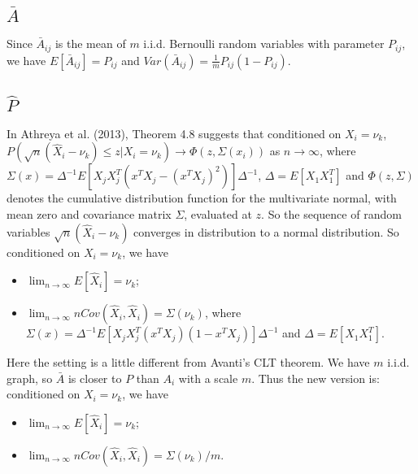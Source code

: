 \documentclass[a4paper]{article}
\begin{document}
\subsection{$\bar{A}$}

Since $\bar{A}_{ij}$ is the mean of $m$ i.i.d. Bernoulli random variables with parameter $P_{ij}$, we have $E[\bar{A}_{ij}] = P_{ij}$ and $Var(\bar{A}_{ij}) = \frac{1}{m} P_{ij} (1-P_{ij})$.



\subsection{$\hat{P}$}

In Athreya et al. (2013), Theorem 4.8 suggests that conditioned on $X_i = \nu_k$, 
$P \left( \sqrt{n} (\hat{X}_i - \nu_k) \le z | X_i = \nu_k \right) \rightarrow \Phi(z, \Sigma(x_i))$ as $n \rightarrow \infty$, where $\Sigma(x) = \Delta^{-1} E[X_j X_j^T (x^T X_j - (x^T X_j)^2)] \Delta^{-1}$, $\Delta = E[X_1 X_1^T]$ and $\Phi(z, \Sigma)$ denotes the cumulative distribution function for the multivariate normal, with mean zero and covariance matrix $\Sigma$, evaluated at $z$. So the sequence of random variables $\sqrt{n} (\hat{X}_i - \nu_k)$ converges in distribution to a normal distribution.
So conditioned on $X_i = \nu_k$, we have
\begin{itemize}
\item $\lim_{n \rightarrow \infty} E[\hat{X}_i] = \nu_k$;
\item $\lim_{n \rightarrow \infty} n Cov(\hat{X}_i, \hat{X}_i) = \Sigma(\nu_k)$, where $\Sigma(x) = \Delta^{-1} E[X_j X_j^T (x^T X_j)(1 - x^T X_j)] \Delta^{-1}$ and $\Delta = E[X_1 X_1^T]$.
\end{itemize}




Here the setting is a little different from Avanti's CLT theorem. We have $m$ i.i.d. graph, so $\bar{A}$ is closer to $P$ than $A_i$ with a scale $m$. Thus the new version is: conditioned on $X_i = \nu_k$, we have
\begin{itemize}
\item $\lim_{n \rightarrow \infty} E[\hat{X}_i] = \nu_k$;
\item $\lim_{n \rightarrow \infty} n Cov(\hat{X}_i, \hat{X}_i) = \Sigma(\nu_k)/m$.
\end{itemize}

\end{document}
